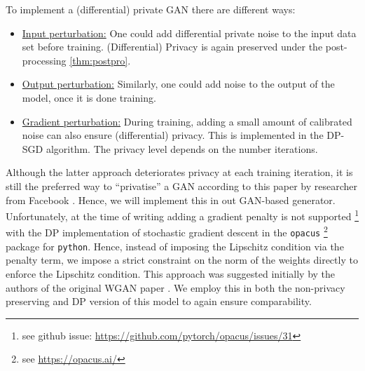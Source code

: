 To implement a (differential) private GAN there are different ways:
\begin{itemize}
    \item \underline{Input perturbation:} One could add differential private noise to the input data set before training. (Differential) Privacy is again preserved under the post-processing \cref{thm:postpro}.
    \item \underline{Output perturbation:} Similarly, one could add noise to the output of the model, once it is done training. 
    \item \underline{Gradient perturbation:} During training, adding a small amount of calibrated noise can also ensure (differential) privacy. This is implemented in the DP-SGD algorithm. The privacy level depends on the number iterations. 
\end{itemize}
Although the latter approach deteriorates privacy at each training iteration, it is still the preferred way to ``privatise'' a GAN according to this paper by researcher from Facebook \parencite{vandermaaten2020tradeoffs}. Hence, we will implement this in out GAN-based generator. Unfortunately, at the time of writing adding a gradient penalty is not supported \footnote{see github issue: \href{https://github.com/pytorch/opacus/issues/31}{https://github.com/pytorch/opacus/issues/31}} with the DP implementation of stochastic gradient descent in the \texttt{opacus} \footnote{see \href{https://opacus.ai/}{https://opacus.ai/}} package for \texttt{python}. Hence, instead of imposing the Lipschitz condition via the penalty term, we impose a strict constraint on the norm of the weights directly to enforce the Lipschitz condition. This approach was suggested initially by the authors of the original WGAN paper \parencite{arjovsky2017wasserstein}. We employ this in both the non-privacy preserving and DP version of this model to again ensure comparability.


